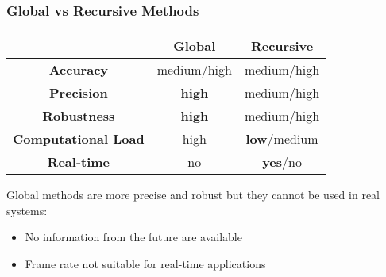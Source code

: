 \begin{frame}
	\frametitle{Global vs Recursive Methods}
	
	\Large
	
	\begin{table}[!t]
		\centering
		\begin{tabular}{ c | c | c | }
			\cline{2-3}
			& \textbf{Global} & \textbf{Recursive} \\ \hline
			
			\multicolumn{1}{|c|}{\textbf{Accuracy}} & medium/high & medium/high \\ \hline
			\multicolumn{1}{|c|}{\textbf{Precision}} & \textbf{high} & medium/high \\ \hline
			\multicolumn{1}{|c|}{\textbf{Robustness}} & \textbf{high} & medium/high \\ \hline
			\multicolumn{1}{|c|}{\textbf{Computational Load}} & high & \textbf{low}/medium \\ \hline
			\multicolumn{1}{|c|}{\textbf{Real-time}} & no & \textbf{yes}/no \\ \hline
		\end{tabular}
	\end{table}
	
	Global methods are more precise and robust but they cannot be used in real systems:
	\begin{itemize}
		\item No information from the future are available
		\item Frame rate not suitable for real-time applications
	\end{itemize}
\end{frame}
